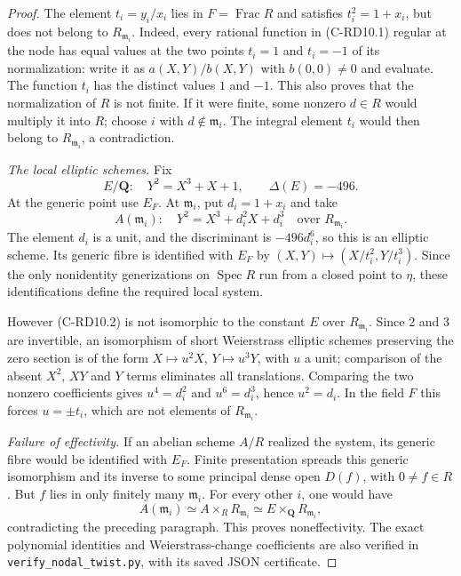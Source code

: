 \begin{proof}
The element $t_i=y_i/x_i$ lies in $F=\operatorname{Frac}R$ and satisfies
$t_i^2=1+x_i$, but does not belong to $R_{\mathfrak m_i}$. Indeed,
every rational function in (C-RD10.1) regular at the node has equal
values at the two points $t_i=1$ and $t_i=-1$ of its normalization:
write it as $a(X,Y)/b(X,Y)$ with $b(0,0)\ne0$ and evaluate. The
function $t_i$ has the distinct values $1$ and $-1$.
This also proves that the normalization of $R$ is not finite. If it
were finite, some nonzero $d\in R$ would multiply it into $R$; choose
$i$ with $d\notin\mathfrak m_i$. The integral element $t_i$ would
then belong to $R_{\mathfrak m_i}$, a contradiction.

\emph{The local elliptic schemes.} Fix
\[
 E/\mathbf Q:\quad Y^2=X^3+X+1,
 \qquad \Delta(E)=-496.
\]
At the generic point use $E_F$. At $\mathfrak m_i$, put $d_i=1+x_i$
and take
\[
 A(\mathfrak m_i):\quad
 Y^2=X^3+d_i^2X+d_i^3
 \quad\text{over }R_{\mathfrak m_i}.                    \tag{C-RD10.2}
\]
The element $d_i$ is a unit, and the discriminant is $-496d_i^6$,
so this is an elliptic scheme. Its generic fibre is identified with
$E_F$ by $(X,Y)\mapsto(X/t_i^2,Y/t_i^3)$. Since the only nonidentity
generizations on $\operatorname{Spec}R$ run from a closed point to
$\eta$, these identifications define the required local system.

However (C-RD10.2) is not isomorphic to the constant $E$ over
$R_{\mathfrak m_i}$. Since $2$ and $3$ are invertible, an isomorphism
of short Weierstrass elliptic schemes preserving the zero section is
of the form $X\mapsto u^2X$, $Y\mapsto u^3Y$, with $u$ a unit;
comparison of the absent $X^2$, $XY$ and $Y$ terms eliminates all
translations. Comparing the two nonzero coefficients gives
$u^4=d_i^2$ and $u^6=d_i^3$, hence $u^2=d_i$. In the field $F$ this
forces $u=\pm t_i$, which are not elements of $R_{\mathfrak m_i}$.

\emph{Failure of effectivity.} If an abelian scheme $A/R$ realized the
system, its generic fibre would be identified with $E_F$. Finite
presentation spreads this generic isomorphism and its inverse to
some principal dense open $D(f)$, with $0\ne f\in R$. But $f$ lies
in only finitely many $\mathfrak m_i$. For every other $i$, one would
have
\[
 A(\mathfrak m_i)\simeq A\times_RR_{\mathfrak m_i}
   \simeq E\times_{\mathbf Q}R_{\mathfrak m_i},
\]
contradicting the preceding paragraph. This proves noneffectivity. The exact polynomial identities and
Weierstrass-change coefficients are also verified in
\texttt{verify\_nodal\_twist.py}, with its saved JSON certificate.
\end{proof}

